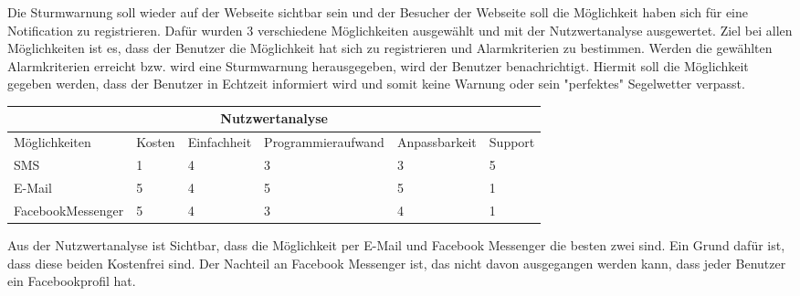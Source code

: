 Die Sturmwarnung soll wieder auf der Webseite sichtbar sein und der Besucher der Webseite soll die Möglichkeit haben sich für eine Notification zu registrieren. Dafür wurden 3 verschiedene Möglichkeiten ausgewählt und mit der Nutzwertanalyse ausgewertet. Ziel bei allen Möglichkeiten ist es, dass der Benutzer die Möglichkeit hat sich zu registrieren und Alarmkriterien zu bestimmen. Werden die gewählten Alarmkriterien erreicht bzw. wird eine Sturmwarnung herausgegeben, wird der Benutzer benachrichtigt. Hiermit soll die Möglichkeit gegeben werden, dass der Benutzer in Echtzeit informiert wird und somit keine Warnung oder sein "perfektes" Segelwetter verpasst.  

\begin{center}
\begin{tabular}{ |p{3.5cm}||p{1cm}|p{2cm}|p{3.5cm}|p{2.5cm}|p{1.5cm}|}
 \hline
 \multicolumn{6}{|c|}{Nutzwertanalyse} \\
 \hline
	Möglichkeiten & Kosten & Einfachheit & Programmieraufwand & Anpassbarkeit & Support\\
 \hline
	SMS & 1 & 4 & 3 & 3 & 5\\
	E-Mail & 5 & 4 & 5 & 5 & 1\\
	FacebookMessenger & 5 & 4 & 3 & 4 & 1\\
 
\hline
\end{tabular}
\end{center}

Aus der Nutzwertanalyse ist Sichtbar, dass die Möglichkeit per E-Mail und Facebook Messenger die besten zwei sind. Ein Grund dafür ist, dass diese beiden Kostenfrei sind. Der Nachteil an Facebook Messenger ist, das nicht davon ausgegangen werden kann, dass jeder Benutzer ein Facebookprofil hat. 
